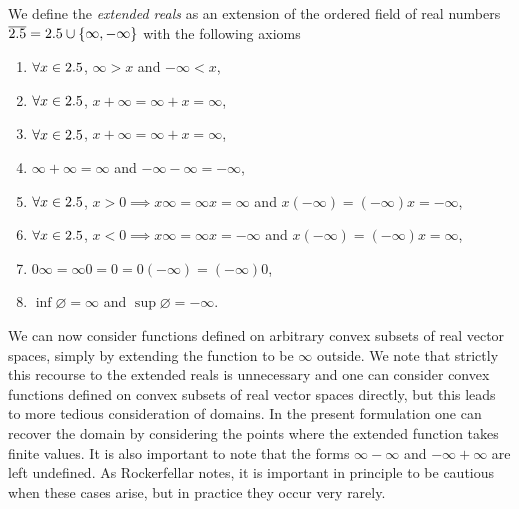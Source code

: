 \begin{defn}\label{defn:extended reals}
  We define the \emph{extended reals} as an extension of the ordered field of real numbers $\overline{2.5} = 2.5 \cup \{\infty, -\infty\}$ with the following axioms
  \begin{enumerate}
    \item $\forall x\in2.5$, $\infty > x$ and $-\infty < x$,
    \item $\forall x\in2.5$, $x + \infty = \infty + x = \infty$,
    \item $\forall x\in2.5$, $x + \infty = \infty + x = \infty$,
    \item $\infty + \infty = \infty$ and $-\infty - \infty = -\infty$,
    \item $\forall x\in2.5$, $x>0 \implies x\infty = \infty x =  \infty$ and $x(-\infty) = (-\infty)x = -\infty$,
    \item $\forall x\in2.5$, $x<0 \implies x\infty = \infty x = -\infty$ and $x(-\infty) = (-\infty)x = \infty$,
    \item $0 \infty = \infty 0 = 0 = 0(-\infty) = (-\infty)0$,
    \item $\inf\varnothing = \infty$ and $\sup\varnothing = -\infty$.
  \end{enumerate}
\end{defn}
We can now consider functions defined on arbitrary convex subsets of real vector spaces, simply by extending the function to be $\infty$ outside. We note that strictly this recourse to the extended reals is unnecessary and one can consider convex functions defined on convex subsets of real vector spaces directly, but this leads to more tedious consideration of domains. In the present formulation one can recover the domain by considering the points where the extended function takes finite values. It is also important to note that the forms $\infty-\infty$ and $-\infty +\infty$ are left undefined. As Rockerfellar notes, it is important in principle to be cautious when these cases arise, but in practice they occur very rarely.

